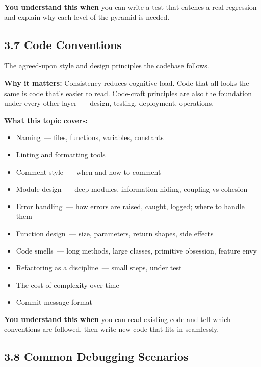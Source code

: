 \noindent{}\textbf{You understand this when} you can write a test that catches a real regression and explain why each level of the pyramid is needed.

\subsection*{3.7 Code Conventions}\label{project-planning-guide:37-code-conventions}

The agreed-upon style and design principles the codebase follows.

\textbf{Why it matters:} Consistency reduces cognitive load. Code that all looks the same is code that's easier to read. Code-craft principles are also the foundation under every other layer~--- design, testing, deployment, operations.

\textbf{What this topic covers:}

\begin{itemize}
\tightlist
\item
  Naming~--- files, functions, variables, constants
\item
  Linting and formatting tools
\item
  Comment style~--- when and how to comment
\item
  Module design~--- deep modules, information hiding, coupling vs cohesion
\item
  Error handling~--- how errors are raised, caught, logged; where to handle them
\item
  Function design~--- size, parameters, return shapes, side effects
\item
  Code smells~--- long methods, large classes, primitive obsession, feature envy
\item
  Refactoring as a discipline~--- small steps, under test
\item
  The cost of complexity over time
\item
  Commit message format
\end{itemize}

\noindent{}\textbf{You understand this when} you can read existing code and tell which conventions are followed, then write new code that fits in seamlessly.

\subsection*{3.8 Common Debugging Scenarios}\label{project-planning-guide:38-common-debugging-scenarios}

